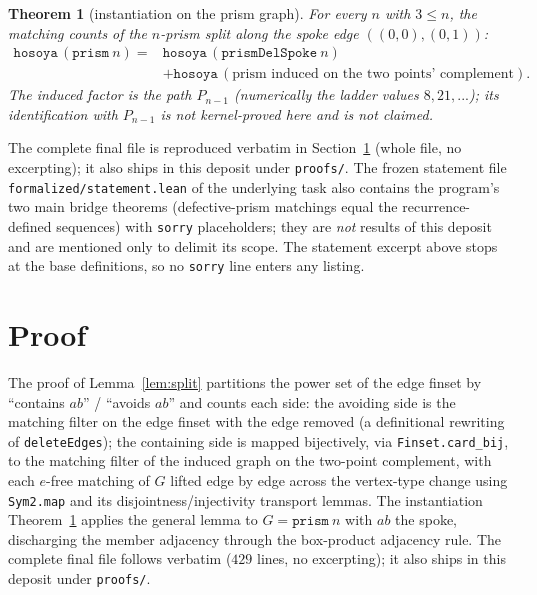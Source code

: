 \documentclass[11pt]{article}
\newtheorem{theorem}{Theorem}
\theoremstyle{definition}
\begin{document}
\begin{theorem}[instantiation on the prism graph]\label{thm:prismsplit}
For every $n$ with $3\le n$, the matching counts of the $n$-prism split along
the spoke edge $((0,0),(0,1))$:
\begin{align*}
\mathtt{hosoya}\,(\mathtt{prism}\ n)
={}&\mathtt{hosoya}\,(\mathtt{prismDelSpoke}\ n)\\
&+\mathtt{hosoya}\,(\text{prism induced on the two points' complement}).
\end{align*}
The induced factor is the path $P_{n-1}$ (numerically the ladder values
$8,21,...$); its identification with $P_{n-1}$ is not kernel-proved here and
is not claimed.
\end{theorem}

The complete final file is reproduced verbatim in
Section~\ref{sec:proof} (whole file, no excerpting); it also ships in this
deposit under \texttt{proofs/}. The frozen statement file
\texttt{formalized/statement.lean} of the underlying task also contains the
program's two main bridge theorems (defective-prism matchings equal the
recurrence-defined sequences) with \texttt{sorry} placeholders; they are
\emph{not} results of this deposit and are mentioned only to delimit its
scope. The statement excerpt above stops at the base definitions, so no
\texttt{sorry} line enters any listing.

\section{Proof}\label{sec:proof}

The proof of Lemma~\ref{lem:split} partitions the power set of the edge
finset by ``contains $ab$'' / ``avoids $ab$'' and counts each side: the
avoiding side is the matching filter on the edge finset with the edge removed
(a definitional rewriting of \texttt{deleteEdges}); the containing side is
mapped bijectively, via \texttt{Finset.card\_bij}, to the matching filter of
the induced graph on the two-point complement, with each $e$-free matching of
$G$ lifted edge by edge across the vertex-type change using \texttt{Sym2.map}
and its disjointness/injectivity transport lemmas. The instantiation
Theorem~\ref{thm:prismsplit} applies the general lemma to
$G=\mathtt{prism}\ n$ with $ab$ the spoke, discharging the member
adjacency through the box-product adjacency rule. The complete final file
follows verbatim ($429$ lines, no excerpting); it also ships in this deposit
under \texttt{proofs/}.
\end{document}
